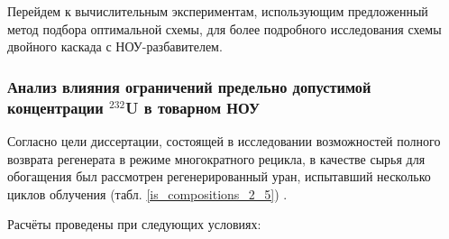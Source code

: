 Перейдем к вычислительным экспериментам, использующим предложенный метод подбора оптимальной схемы, для более подробного исследования схемы двойного каскада с НОУ-разбавителем.

\subsubsection{Анализ влияния ограничений предельно допустимой концентрации $^{232}$U в товарном НОУ}

Согласно цели диссертации, состоящей в исследовании возможностей полного возврата регенерата в режиме многократного рецикла, в качестве сырья для обогащения был рассмотрен регенерированный уран, испытавший несколько циклов облучения (табл. \ref{is_compositions_2_5}) \cite{palkinDesignanalyticalResearchRefinement2010}.

Расчёты проведены при следующих условиях:

